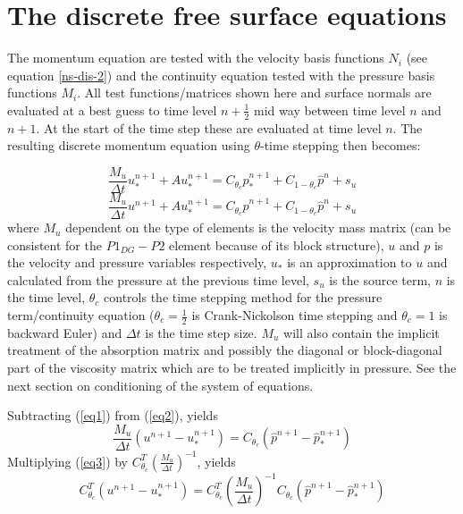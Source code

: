 \vfill\eject



\section{The discrete free surface equations}
\noindent The momentum equation are tested with the velocity 
basis functions $N_i$ (see equation \ref{ns-dis-2}) and the continuity equation tested 
with the pressure basis functions $M_i$. All test functions/matrices 
shown here and surface normals are evaluated at a best guess to 
time level $n+\frac{1}{2}$ mid way 
between time level $n$ and $n+1$. At the start of the time 
step these are evaluated at time level $n$. 
The resulting discrete momentum equation using $\theta$-time stepping then becomes: 

\begin{equation}
\frac{M_u}{\Delta t}u_*^{n+1}+Au_*^{n+1}=  C_{\theta_c} {\hat p}_*^{n+1}
+C_{1-\theta_c} {\hat p}^n+s_u
\label{eq1}
\end{equation}
\begin{equation}
\frac{M_u}{\Delta t}u^{n+1}+Au_*^{n+1}=C_{\theta_c} {\hat p}^{n+1}
+C_{1-\theta_c} {\hat p}^n+s_u
\label{eq2}
\end{equation}
where $M_u$ dependent on the type of elements is the velocity mass matrix (can be consistent 
for the $P1_{DG}-P2$ element because of its block structure), 
$u$ and $p$ is the velocity and pressure variables respectively, 
$u_*$ is an approximation to $u$ and calculated from the 
pressure at the previous time level, 
$s_u$ is the source term, $n$ is the time level, $\theta_c$ controls 
the time stepping method for the pressure term/continuity equation 
($\theta_c=\frac{1}{2}$ is Crank-Nickolson time stepping and 
$\theta_c=1$ is backward Euler) 
and $\Delta t$ is the time step size. $M_u$ will also contain the 
implicit treatment of the absorption matrix and possibly the diagonal or block-diagonal 
part of 
the viscosity matrix which are to be treated implicitly in pressure. See 
the next section on conditioning of the system of equations. 

\noindent Subtracting (\ref{eq1}) from (\ref{eq2}), yields
\begin{equation}
\frac{M_u}{\Delta t}(u^{n+1}-u_*^{n+1})= C_{\theta_c} ({\hat p}^{n+1}-{\hat p}_*^{n+1})
\label{u-eqn}
\end{equation}
\noindent Multiplying (\ref{eq3}) by $C_{\theta_c}^T (\frac{M_u}{\Delta t})^{-1}$, yields
\begin{equation}
C_{\theta_c}^T (u^{n+1}-u_*^{n+1})=
C_{\theta_c}^T \left(\frac{M_u}{\Delta t}\right)^{-1} 
C_{\theta_c} ({\hat p}^{n+1}-{\hat p}_*^{n+1})
\label{eq3}
\end{equation}

